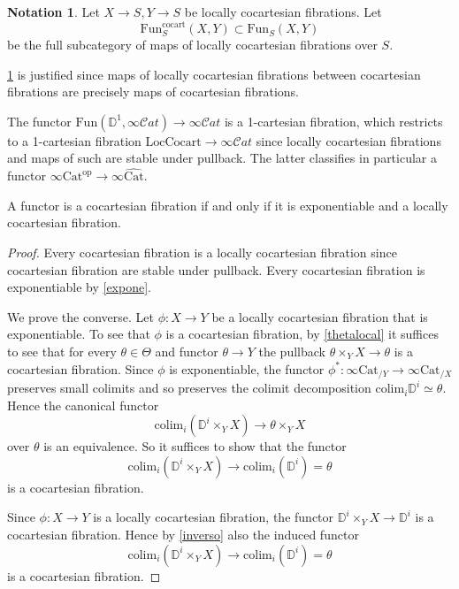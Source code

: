 \documentclass[10pt,oneside]{article}
\numberwithin{equation}{section} %
\numberwithin{figure}{section} %
\theoremstyle{plain}
\theoremstyle{definition}
\newtheorem{notation}[thm]{Notation}
\newcommand{\bD}{{\mathbb D}}
\newcommand{\op}{\mathrm{op}}
\newcommand{\colim}{\mathrm{colim}}
\newcommand{\Cat}{\mathrm{Cat}}
\newcommand{\Fun}{\mathrm{Fun}}
\newcommand{\cocart}{{\mathrm{cocart}}}
\newcommand{\scat}{\mathcal{C}\mathit{at}}
\begin{document}
\begin{notation}\label{reuft} Let $X \to S, Y \to S$ be locally cocartesian fibrations.
Let $$ \Fun^\cocart_S(X,Y) \subset \Fun_S(X,Y)$$ be the full subcategory of maps of locally cocartesian fibrations over $S$.

\end{notation}

\begin{remark}

\cref{reuft} is justified since maps of locally cocartesian fibrations between cocartesian fibrations are precisely maps of cocartesian fibrations.

\end{remark}

\begin{remark}

The functor $\Fun(\bD^1, \infty\scat) \to \infty\scat$ is a 1-cartesian fibration, which restricts to a 1-cartesian fibration
$ \mathrm{Loc}\mathrm{Cocart} \to \infty\scat $ since locally cocartesian fibrations and maps of such are stable under pullback.
The latter classifies in particular a functor $\infty\Cat^\op \to \infty\widehat{\Cat}.$

\end{remark}

\begin{theorem}\label{cocexp}

A functor is a cocartesian fibration if and only if it is  exponentiable and a locally cocartesian fibration.
    
\end{theorem}

\begin{proof}

Every cocartesian fibration is a locally cocartesian fibration
since cocartesian fibration are stable under pullback.
Every cocartesian fibration is exponentiable by \cref{expone}.

We prove the converse. Let $\phi: X \to Y$ be a locally cocartesian fibration that is exponentiable.
To see that $\phi$ is a cocartesian fibration, by \cref{thetalocal} it suffices to see that for every $\theta \in \Theta$ and functor $\theta \to Y$
the pullback $\theta \times_{Y} X \to \theta $ is a cocartesian fibration. Since $\phi$ is exponentiable, the functor
$\phi^*: \infty\Cat_{/Y} \to \infty\Cat_{/X}$ preserves small colimits
and so preserves the colimit decomposition $\colim_{i} \bD^i \simeq \theta.$ Hence the canonical functor 
$$ \colim_{i}(\bD^i \times_{Y} X) \to \theta \times_{Y} X $$ 
over $\theta$ is an equivalence.
So it suffices to show that the functor $$ \colim_{i}(\bD^i \times_{Y} X) \to \colim_{i}(\bD^i) = \theta$$ is a cocartesian fibration.

Since $\phi: X \to Y$ is a locally cocartesian fibration, the functor
$\bD^i \times_{Y} X \to \bD^i$ is a cocartesian fibration.
Hence by \cref{inverso} also the induced functor $$ \colim_{i}(\bD^i \times_{Y} X) \to \colim_{i}(\bD^i) = \theta$$ is a cocartesian fibration.
\end{proof}
\end{document}
